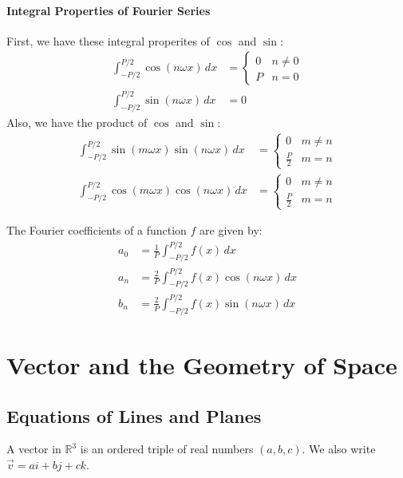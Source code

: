 \documentclass[11pt]{report}
\begin{document}
\paragraph{Integral Properties of Fourier Series} First, we have these integral properites of $\cos$ and $\sin$:
\begin{align}
    \int_{-P/2}^{P/2} \cos(n\omega x) \, dx &= \begin{cases}
        0 & n \ne 0 \\
        P & n = 0
    \end{cases} \\
    \int_{-P/2}^{P/2} \sin(n\omega x) \, dx &= 0
\end{align}
Also, we have the product of $\cos$ and $\sin$:
\begin{align}
    \int_{-P/2}^{P/2} \sin(m\omega x) \sin(n\omega x) \, dx &= \begin{cases}
        0 & m \ne n \\
        \frac{P}{2} & m = n
    \end{cases} \\ 
    \int_{-P/2}^{P/2} \cos(m\omega x) \cos(n\omega x) \, dx &= \begin{cases}
        0 & m \ne n \\
        \frac{P}{2} & m = n
    \end{cases} 
\end{align}
\begin{theorem}
    The Fourier coefficients of a function $f$ are given by:
    \begin{align}
        a_0 &= \frac{1}{P} \int_{-P/2}^{P/2} f(x) \, dx \\
        a_n &= \frac{2}{P} \int_{-P/2}^{P/2} f(x) \cos(n\omega x) \, dx \\
        b_n &= \frac{2}{P} \int_{-P/2}^{P/2} f(x) \sin(n\omega x) \, dx
    \end{align}
\end{theorem}
\section{Vector and the Geometry of Space}
\subsection{Equations of Lines and Planes}
\begin{definition}
    A vector in $\mathbb{R}^3$ is an ordered triple of real numbers $(a, b, c)$. We also write $\vec{v} = ai + bj + ck$.
\end{definition}
\end{document}

